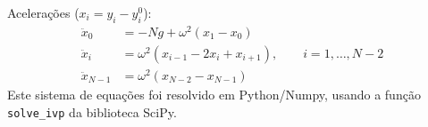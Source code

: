 Acelerações ($x_i=y_i-y_i^0$):
  \begin{align*}
    \ddot x_0 &=-Ng+\omega^2(x_1-x_0)\\
    \ddot x_i &= \omega^2(x_{i-1}-2x_i+x_{i+1}),\qquad i=1, \ldots, N-2\\
    \ddot x_{N-1} &=\omega^2(x_{N-2}-x_{N-1})
  \end{align*}
Este sistema de equações foi resolvido em Python/Numpy, usando a função
\texttt{solve\_ivp} da biblioteca SciPy.
